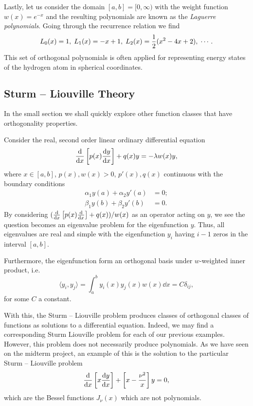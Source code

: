 \documentclass[
]{article}
\theoremstyle{definition}
\theoremstyle{definition}
\begin{document}
Lastly, let us consider the domain \([a, b] = [0, \infty)\) with the
weight function \(w(x) = e^{-x}\) and the resulting polynomials are
known as the \emph{Laguerre polynomials}. Going through the recurrence
relation we find
\[L_0(x) = 1, \hspace{1mm} L_1(x) = -x + 1, \hspace{1mm} 
  L_2(x) = \frac{1}{2}(x^2 - 4 x +2), \hspace{1mm} \cdots.\] This set of
orthogonal polynomials is often applied for representing energy states
of the hydrogen atom in spherical coordinates.

\hypertarget{sturm-liouville-theory}{%
\subsection{Sturm -- Liouville Theory}\label{sturm-liouville-theory}}

In the small section we shall quickly explore other function classes
that have orthogonality properties.

Consider the real, second order linear ordinary differential equation
\[\dv{x}\left[p(x) \dv{y}{x}\right] + q(x) y = -\lambda w(x)y,\] where
\(x \in [a, b]\), \(p(x), w(x) > 0\), \(p'(x), q(x)\) continuous with
the boundary conditions \[\begin{split}
  \alpha_1 y(a) + \alpha_2 y'(a) & = 0;\\
  \beta_1 y(b) + \beta_2 y'(b) & = 0.
\end{split}\] By considering
\((\dv{x}\left[p(x) \dv{x}\right] + q(x)) / w(x)\) as an operator acting
on \(y\), we see the question becomes an eigenvalue problem for the
eigenfunction \(y\). Thus, all eigenvalues are real and simple with the
eigenfunction \(y_i\) having \(i - 1\) zeros in the interval \([a, b]\).

Furthermore, the eigenfunction form an orthogonal basis under
\(w\)-weighted inner product, i.e.~
\[\langle y_i, y_j \rangle = \int_a^b y_i(x) y_j(x) w(x) \dd x = C \delta_{ij},\]
for some \(C\) a constant.

With this, the Sturm -- Liouville problem produces classes of orthogonal
classes of functions as solutions to a differential equation. Indeed, we
may find a corresponding Sturm Liouville problem for each of our
previous examples. However, this problem does not necessarily produce
polynomials. As we have seen on the midterm project, an example of this
is the solution to the particular Sturm -- Liouville problem
\[\dv{x}\left[x \dv{y}{x}\right] + \left[x - \frac{\nu^2}{x}\right] y = 0,\]
which are the Bessel functions \(J_{\nu}(x)\) which are not polynomials.
\end{document}
